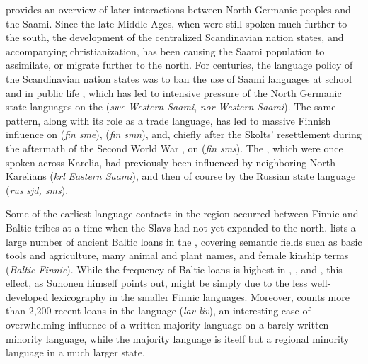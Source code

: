 \cite{zachrisson2008} provides an overview of later interactions between North Germanic peoples and the Saami. Since the late Middle Ages, when  were still spoken much further to the south, the development of the centralized Scandinavian nation states, and accompanying christianization, has been causing the Saami population to assimilate, or migrate further to the north. For centuries, the language policy of the Scandinavian nation states was to ban the use of Saami languages at school and in public life \citep{corson1995}, which has led to intensive pressure of the North Germanic state languages on the  (\textit{swe} \arrowLA \textit{Western Saami}, \textit{nor} \arrowLA \textit{Western Saami}). The same pattern, along with its role as a trade language, has led to massive Finnish influence on  (\textit{fin} \arrowOA \textit{sme}),  (\textit{fin} \arrowOA \textit{smn}), and, chiefly after the 
Skolts' resettlement during the aftermath of the Second World War \citep{feist2011}, on  (\textit{fin} \arrowOA \textit{sms}). The , which were once spoken across Karelia, had previously been influenced \citep{sergejeva2000} by neighboring North Karelians (\textit{krl} \arrowOA \textit{Eastern Saami}), and then of course by the Russian state language (\textit{rus} \arrowLA \textit{sjd, sms}).

Some of the earliest language contacts in the region occurred between Finnic and Baltic tribes at a time when the Slavs had not yet expanded to the north. \cite{suhonen1988} lists a large number of ancient Baltic loans in the , covering semantic fields such as basic tools and agriculture, many animal and plant names, and female kinship terms (\textit{Baltic \arrowLA Finnic}). While the frequency of Baltic loans is highest in , , and , this effect, as Suhonen himself points out, might be simply due to the less well-developed lexicography in the smaller Finnic languages. Moreover, \cite{suhonen1973} counts more than 2,200 recent  loans in the  language (\textit{lav \arrowLA liv}), an interesting case of overwhelming influence of a written majority language on a barely written minority language, while the majority language is itself but a regional minority language in a much larger state.

